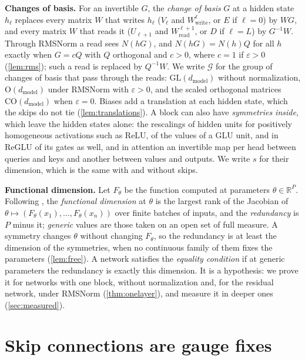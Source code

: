 \documentclass[10pt]{article}
\theoremstyle{definition}
\theoremstyle{remark}
\newcommand{\R}{\mathbb{R}}
\newcommand{\Wread}{W_{\mathrm{read}}}
\newcommand{\Wwrite}{W_{\mathrm{write}}}
\newcommand{\dm}{d_{\mathrm{model}}}
\newcommand{\GL}{\mathrm{GL}}
\newcommand{\Ort}{\mathrm{O}}
\newcommand{\CO}{\mathrm{CO}}
\newcommand{\G}{\mathcal{G}}
\newcommand{\para}[1]{\smallskip\noindent\textbf{#1}\hspace{0.5em}}
\begin{document}
\para{Changes of basis.} For an invertible $G$, the \emph{change of basis} $G$ at a hidden state $h_\ell$ replaces every matrix $W$ that writes $h_\ell$ ($V_\ell$ and $\Wwrite^{\ell}$, or $E$ if $\ell = 0$) by $WG$, and every matrix $W$ that reads it ($U_{\ell+1}$ and $\Wread^{\ell+1}$, or $D$ if $\ell = L$) by $G^{-1}W$. Through RMSNorm a read sees $N(hG)$, and $N(hG) = N(h)Q$ for all $h$ exactly when $G = cQ$ with $Q$ orthogonal and $c > 0$, where $c = 1$ if $\varepsilon > 0$ (\cref{lem:rms}); such a read is replaced by $Q^{-1}W$. We write $\G$ for the group of changes of basis that pass through the reads: $\GL(\dm)$ without normalization, $\Ort(\dm)$ under RMSNorm with $\varepsilon > 0$, and the scaled orthogonal matrices $\CO(\dm)$ when $\varepsilon = 0$. Biases add a translation at each hidden state, which the skips do not tie (\cref{lem:translations}). A block can also have \emph{symmetries inside}, which leave the hidden states alone: the rescalings of hidden units for positively homogeneous activations such as ReLU, of the values of a GLU unit, and in ReGLU of its gates as well, and in attention an invertible map per head between queries and keys and another between values and outputs. We write $s$ for their dimension, which is the same with and without skips.

\para{Functional dimension.} Let $F_\theta$ be the function computed at parameters $\theta \in \R^P$. Following \citet{grigsby2022functional}, the \emph{functional dimension} at $\theta$ is the largest rank of the Jacobian of $\theta \mapsto (F_\theta(x_1), \dots, F_\theta(x_n))$ over finite batches of inputs, and the \emph{redundancy} is $P$ minus it; \emph{generic} values are those taken on an open set of full measure. A symmetry changes $\theta$ without changing $F_\theta$, so the redundancy is at least the dimension of the symmetries, when no continuous family of them fixes the parameters (\cref{lem:free}). A network satisfies the \emph{equality condition} if at generic parameters the redundancy is exactly this dimension. It is a hypothesis: we prove it for networks with one block, without normalization and, for the residual network, under RMSNorm (\cref{thm:onelayer}), and measure it in deeper ones (\cref{sec:measured}).

\section{Skip connections are gauge fixes}\label{sec:gauge}
\end{document}
